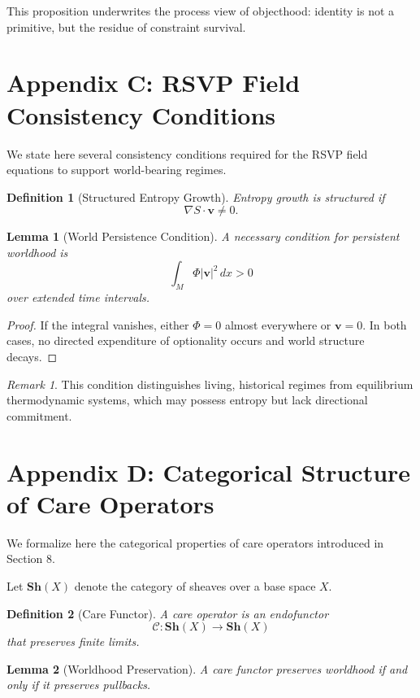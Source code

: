 \documentclass[11pt]{article}
\newtheorem{definition}{Definition}
\newtheorem{lemma}{Lemma}
\theoremstyle{remark}
\newtheorem{remark}{Remark}
\begin{document}
This proposition underwrites the process view of objecthood: identity is not a primitive, but the residue of constraint survival.

\section{Appendix C: RSVP Field Consistency Conditions}

We state here several consistency conditions required for the RSVP field equations to support world-bearing regimes.

\begin{definition}[Structured Entropy Growth]
Entropy growth is structured if
\[
\nabla S \cdot \mathbf{v} \neq 0.
\]
\end{definition}

\begin{lemma}[World Persistence Condition]
A necessary condition for persistent worldhood is
\[
\int_M \Phi |\mathbf{v}|^2 \, dx > 0
\]
over extended time intervals.
\end{lemma}

\begin{proof}
If the integral vanishes, either $\Phi = 0$ almost everywhere or $\mathbf{v} = 0$. In both cases, no directed expenditure of optionality occurs and world structure decays.
\end{proof}

\begin{remark}
This condition distinguishes living, historical regimes from equilibrium thermodynamic systems, which may possess entropy but lack directional commitment.
\end{remark}

\section{Appendix D: Categorical Structure of Care Operators}

We formalize here the categorical properties of care operators introduced in Section 8.

Let $\mathbf{Sh}(X)$ denote the category of sheaves over a base space $X$.

\begin{definition}[Care Functor]
A care operator is an endofunctor
\[
\mathcal{C} : \mathbf{Sh}(X) \rightarrow \mathbf{Sh}(X)
\]
that preserves finite limits.
\end{definition}

\begin{lemma}[Worldhood Preservation]
A care functor preserves worldhood if and only if it preserves pullbacks.
\end{lemma}
\end{document}
